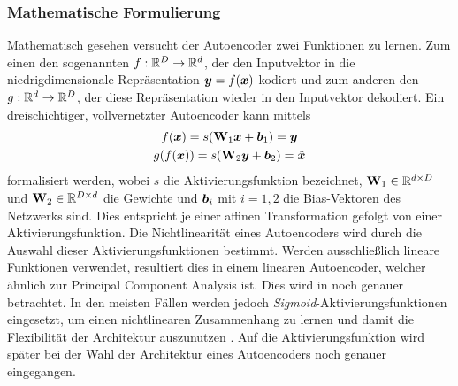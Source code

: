 \subsubsection{Mathematische Formulierung}
\label{ch:MethodenDerDimRed:ML:AE:MathematischeFormulierung}
Mathematisch gesehen versucht der Autoencoder zwei Funktionen zu lernen. Zum einen den sogenannten  $f: \mathbb{R}^D \rightarrow \mathbb{R}^d$, der den Inputvektor in die niedrigdimensionale Repräsentation $\bm{y} = f(\bm{x})$ kodiert und zum anderen den  $g: \mathbb{R}^d \rightarrow \mathbb{R}^D$, der diese Repräsentation wieder in den Inputvektor dekodiert. Ein dreischichtiger, vollvernetzter Autoencoder kann mittels
\begin{gather}
	\label{eq:dreischichtigerAE}
	f(\bm{x}) = s(\mathbf{W}_1 \bm{x} + \bm{b}_1) = \bm{y} \\
	g(f(\bm{x})) = s(\mathbf{W}_2 \bm{y} + \bm{b}_2) = \hat{\bm{x}}
\end{gather}
formalisiert werden, wobei $s$ die Aktivierungsfunktion bezeichnet, $\mathbf{W}_1 \in \mathbb{R}^{d \times D}$ und $\mathbf{W}_2 \in \mathbb{R}^{D \times d}$ die Gewichte und $\bm{b}_i$ mit $i = 1,2$ die Bias-Vektoren des Netzwerks sind. Dies entspricht je einer affinen Transformation gefolgt von einer Aktivierungsfunktion. Die Nichtlinearität eines Autoencoders wird durch die Auswahl dieser Aktivierungsfunktionen bestimmt.
Werden ausschließlich lineare Funktionen verwendet, resultiert dies in einem linearen Autoencoder,
welcher ähnlich zur Principal Component Analysis ist. Dies wird in
 noch genauer betrachtet. In den meisten Fällen werden
jedoch \textit{Sigmoid}-Aktivierungsfunktionen eingesetzt, um einen nichtlinearen Zusammenhang zu
lernen und damit die Flexibilität der Architektur auszunutzen \parencite[4]{Charte.2018}. Auf die Aktivierungsfunktion wird später bei der Wahl der Architektur eines
Autoencoders noch genauer eingegangen.

